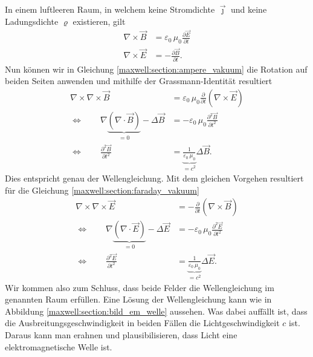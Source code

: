 In einem luftleeren Raum, in welchem keine Stromdichte $\vec{\jmath}$ und keine Ladungsdichte $\varrho$ existieren, gilt
\begin{align}
\nabla \times \vec{B}
&=
\varepsilon_0\,\mu_0 \frac{\partial \vec{E}}{\partial t}
\label{maxwell:section:ampere_vakuum}
\\
\nabla \times \vec{E}
&=
-\frac{\partial \vec{B}}{\partial t}.
\label{maxwell:section:faraday_vakuum}
\end{align}
Nun können wir in Gleichung \eqref{maxwell:section:ampere_vakuum} die Rotation auf beiden Seiten anwenden und mithilfe der Grassmann-Identität resultiert
\begin{align*}
\nabla \times \nabla \times \vec{B}
&=
\varepsilon_0\,\mu_0 \frac{\partial}{\partial t} (\nabla \times \vec{E})\\
\Leftrightarrow \qquad \nabla \underbrace{(\nabla \cdot \vec{B})}_{\displaystyle=0} - \Delta \vec{B}
&=
-\varepsilon_0\,\mu_0 \frac{\partial ^2 \vec{B}}{\partial t^2}\\
\Leftrightarrow \qquad \frac{\partial ^2 \vec{B}}{\partial t^2}
&=
\underbrace{\frac{1}{\varepsilon_0\,\mu_0}}_{\displaystyle=c^2} \Delta \vec{B}.
\end{align*}
Dies entspricht genau der Wellengleichung.
Mit dem gleichen Vorgehen resultiert für die Gleichung \eqref{maxwell:section:faraday_vakuum}
\begin{align*}
\nabla \times \nabla \times \vec{E}
&=
- \frac{\partial}{\partial t} (\nabla \times \vec{B})\\
\Leftrightarrow \qquad \nabla \underbrace{(\nabla \cdot \vec{E})}_{\displaystyle=0} - \Delta \vec{E}
&=
- \varepsilon_0\,\mu_0 \frac{\partial ^2 \vec{E}}{\partial t^2}\\
\Leftrightarrow \qquad \frac{\partial ^2 \vec{E}}{\partial t^2}
&=
\underbrace{\frac{1}{\varepsilon_0\,\mu_0}}_{\displaystyle=c^2} \Delta \vec{E}.
\end{align*}
Wir kommen also zum Schluss, dass beide Felder die Wellengleichung im genannten Raum erfüllen. Eine Lösung der Wellengleichung kann wie in Abbildung \ref{maxwell:section:bild_em_welle} aussehen. Was dabei auffällt ist, dass die Ausbreitungsgeschwindigkeit in beiden Fällen die Lichtgeschwindigkeit $c$ ist. 
Daraus kann man erahnen und plausibilisieren, dass Licht eine elektromagnetische Welle ist. 


